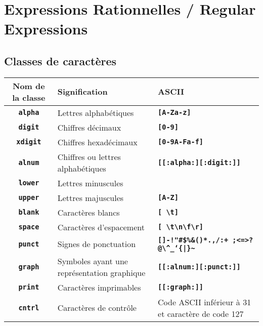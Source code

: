 \documentclass[11pt,a4paper]{article}
\author{Fabrice BOISSIER}
\newcommand{\TTBF}[1]{\texttt{\textbf{#1}}}	%
\begin{document}
\section{Expressions Rationnelles / Regular Expressions}

\bigskip

\subsection{Classes de caractères}

\bigskip


\begin{center}
	\begin{tabular}{ c | M{4cm} | M{7cm} }
  \textbf{Nom de la classe} & \textbf{Signification} & \textbf{ASCII} \\  \hline
	\TTBF{alpha} & Lettres alphabétiques & \TTBF{[A-Za-z]} \\ \hline
	\TTBF{digit} & Chiffres décimaux & \TTBF{[0-9]} \\ \hline
	\TTBF{xdigit} & Chiffres hexadécimaux & \TTBF{[0-9A-Fa-f]} \\ \hline
	\TTBF{alnum} & Chiffres ou lettres alphabétiques & \TTBF{[[:alpha:][:digit:]]} \\ \hline
	\TTBF{lower} & Lettres minuscules & \TTBF{\textquotesingle[a-z]\textquotesingle} \\ \hline
	\TTBF{upper} & Lettres majuscules & \TTBF{[A-Z]} \\ \hline
	\TTBF{blank} & Caractères blancs & \TTBF{[ \textbackslash t]} \\ \hline
	\TTBF{space} & Caractères d'espacement & \TTBF{[ \textbackslash t\textbackslash n\textbackslash f\textbackslash r]} \\ \hline
	\TTBF{punct} & Signes de ponctuation &  \TTBF{[]-!"\#\$\%\&\textquotesingle ()*.,/:+ ;<=>?@\textbackslash \textasciicircum \_\lq \{|\}\textasciitilde } \\ \hline
	\TTBF{graph} & Symboles ayant une représentation graphique & \TTBF{[[:alnum:][:punct:]]} \\ \hline
	\TTBF{print} & Caractères imprimables & \TTBF{[[:graph:]]} \\ \hline
	\TTBF{cntrl} & Caractères de contrôle & Code ASCII inférieur à 31 et caractère de code 127 \\
	\end{tabular}
\end{center}
\end{document}
